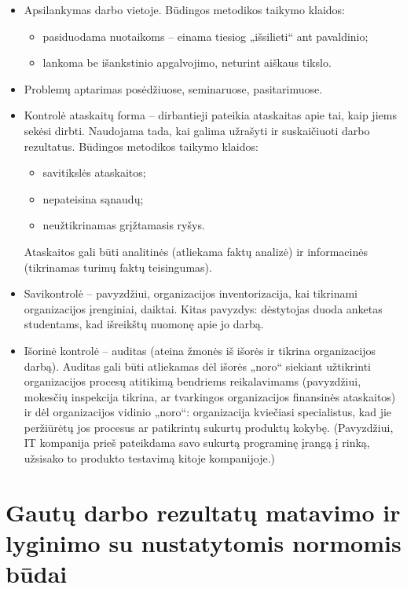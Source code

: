 \begin{itemize}
  \item Apsilankymas darbo vietoje. Būdingos metodikos taikymo
    klaidos:
    \begin{itemize}
      \item pasiduodama nuotaikoms – einama tiesiog „išsilieti“ ant
        pavaldinio;
      \item lankoma be išankstinio apgalvojimo, neturint aiškaus
        tikslo.
    \end{itemize}
  \item Problemų aptarimas posėdžiuose, seminaruose, pasitarimuose.
  \item Kontrolė ataskaitų forma – dirbantieji pateikia ataskaitas
    apie tai, kaip jiems sekėsi dirbti. Naudojama tada, kai galima
    užrašyti ir suskaičiuoti darbo rezultatus. Būdingos metodikos
    taikymo klaidos:
    \begin{itemize}
      \item savitikslės ataskaitos;
      \item nepateisina sąnaudų;
      \item neužtikrinamas grįžtamasis ryšys.
    \end{itemize}
    Ataskaitos gali būti analitinės (atliekama faktų analizė) ir
    informacinės (tikrinamas turimų faktų teisingumas).
  \item Savikontrolė – pavyzdžiui, organizacijos inventorizacija, kai
    tikrinami organizacijos įrenginiai, daiktai. Kitas pavyzdys:
    dėstytojas duoda anketas studentams, kad išreikštų nuomonę apie
    jo darbą.
  \item Išorinė kontrolė – auditas (ateina žmonės iš išorės ir tikrina
    organizacijos darbą). Auditas gali būti atliekamas dėl išorės
    „noro“ siekiant užtikrinti organizacijos procesų atitikimą
    bendriems reikalavimams (pavyzdžiui, mokesčių inspekcija tikrina,
    ar tvarkingos organizacijos finansinės ataskaitos) ir dėl
    organizacijos vidinio „noro“: organizacija kviečiasi
    specialistus, kad jie peržiūrėtų jos procesus ar patikrintų
    sukurtų produktų kokybę. (Pavyzdžiui, IT kompanija prieš
    pateikdama savo sukurtą programinę įrangą į rinką, užsisako
    to produkto testavimą kitoje kompanijoje.)
\end{itemize}

\section{Gautų darbo rezultatų matavimo ir lyginimo su nustatytomis
normomis būdai}

